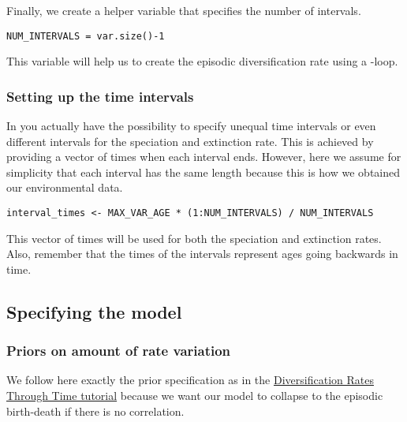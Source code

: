 Finally, we create a helper variable that specifies the number of intervals.
{\tt \begin{snugshade*}
\begin{lstlisting}
NUM_INTERVALS = var.size()-1
\end{lstlisting}
\end{snugshade*}}
This variable will help us to create the episodic diversification rate using a -loop.

\subsubsection{Setting up the time intervals}
In \RevBayes you actually have the possibility to specify unequal time intervals or even different intervals for the speciation and extinction rate.
This is achieved by providing a vector of times when each interval ends.
However, here we assume for simplicity that each interval has the same length because this is how we obtained our environmental data.
{\tt \begin{snugshade*}
\begin{lstlisting}
interval_times <- MAX_VAR_AGE * (1:NUM_INTERVALS) / NUM_INTERVALS
\end{lstlisting}
\end{snugshade*}}
This vector of times will be used for both the speciation and extinction rates.
Also, remember that the times of the intervals represent ages going backwards in time.


\subsection{Specifying the model}

\subsubsection{Priors on amount of rate variation}
We follow here exactly the prior specification as in the \href{https://github.com/revbayes/revbayes_tutorial/raw/master/tutorial_TeX/RB_DiversificationRate_Episodic_Tutorial/RB_DiversificationRate_Episodic_Tutorial.pdf}{Diversification Rates Through Time tutorial} because we want our model to collapse to the episodic birth-death if there is no correlation.

